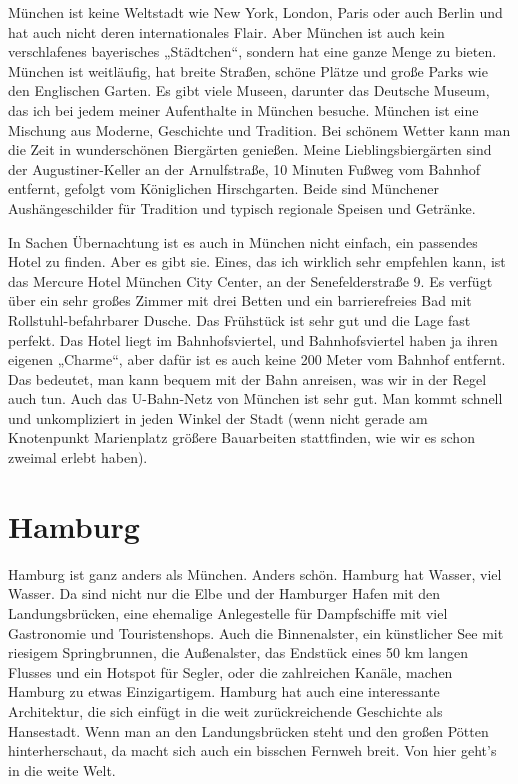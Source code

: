 \documentclass[fontsize=14pt,a4paper,headinclude,DIV=calc,automark]{scrbook}
\begin{document}
München ist keine Weltstadt wie New York, London, Paris oder auch Berlin und hat auch nicht deren internationales Flair. Aber München ist auch kein verschlafenes bayerisches „Städtchen“, sondern hat eine ganze Menge zu bieten. München ist weitläufig, hat breite Straßen, schöne Plätze und große Parks wie den Englischen Garten. Es gibt viele Museen, darunter das Deutsche Museum, das ich bei jedem meiner Aufenthalte in München besuche. München ist eine Mischung aus Moderne, Geschichte und Tradition. Bei schönem Wetter kann man die Zeit in wunderschönen Biergärten genießen. Meine Lieblingsbiergärten sind der Augustiner-Keller an der Arnulfstraße, 10 Minuten Fußweg vom Bahnhof entfernt, gefolgt vom Königlichen Hirschgarten. Beide sind Münchener Aushängeschilder für Tradition und typisch regionale Speisen und Getränke.

In Sachen Übernachtung ist es auch in München nicht einfach, ein passendes Hotel zu finden. Aber es gibt sie. Eines, das ich wirklich sehr empfehlen kann, ist das Mercure Hotel München City Center, an der Senefelderstraße 9. Es verfügt über ein sehr großes Zimmer mit drei Betten und ein barrierefreies Bad mit Rollstuhl-befahrbarer Dusche. Das Frühstück ist sehr gut und die Lage fast perfekt. Das Hotel liegt im Bahnhofsviertel, und Bahnhofsviertel haben ja ihren eigenen „Charme“, aber dafür ist es auch keine 200 Meter vom Bahnhof entfernt. Das bedeutet, man kann bequem mit der Bahn anreisen, was wir in der Regel auch tun. Auch das U-Bahn-Netz von München ist sehr gut. Man kommt schnell und unkompliziert in jeden Winkel der Stadt (wenn nicht gerade am Knotenpunkt Marienplatz größere Bauarbeiten stattfinden, wie wir es schon zweimal erlebt haben).

\section{Hamburg}

Hamburg ist ganz anders als München. Anders schön. Hamburg hat Wasser, viel Wasser. Da sind nicht nur die Elbe und der Hamburger Hafen mit den Landungsbrücken, eine ehemalige Anlegestelle für Dampfschiffe mit viel Gastronomie und Touristenshops. Auch die Binnenalster, ein künstlicher See mit riesigem Springbrunnen, die Außenalster, das Endstück eines 50 km langen Flusses und ein Hotspot für Segler, oder die zahlreichen Kanäle, machen Hamburg zu etwas Einzigartigem. Hamburg hat auch eine interessante Architektur, die sich einfügt in die weit zurückreichende Geschichte als Hansestadt. Wenn man an den Landungsbrücken steht und den großen Pötten hinterherschaut, da macht sich auch ein bisschen Fernweh breit. Von hier geht’s in die weite Welt.
\end{document}

